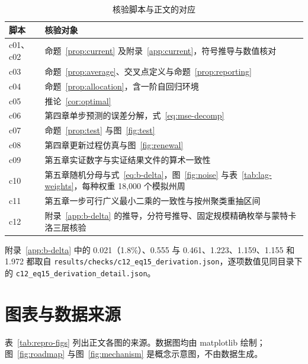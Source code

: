 \begin{table}[!htbp]
  \centering
  \caption{核验脚本与正文的对应}
  \label{tab:repro-checks}
  \small
  \begin{tabularx}{\textwidth}{@{}lX@{}}
    \toprule
    脚本 & 核验对象 \\
    \midrule
    c01、c02 & 命题~\ref{prop:current} 及附录~\ref{app:current}，符号推导与数值核对 \\
    c03 & 命题~\ref{prop:average}、交叉点定义与命题~\ref{prop:reporting} \\
    c04 & 命题~\ref{prop:allocation}，含一阶自回归环境 \\
    c05 & 推论~\ref{cor:optimal} \\
    c06 & 第四章单步预测的误差分解，式~\eqref{eq:mse-decomp} \\
    c07 & 命题~\ref{prop:test} 与图~\ref{fig:test} \\
    c08 & 第四章更新过程仿真与图~\ref{fig:renewal} \\
    c09 & 第五章实证数字与实证结果文件的算术一致性 \\
    c10 & 第五章随机分母与式~\eqref{eq:b-delta}，图~\ref{fig:noise} 与表~\ref{tab:lag-weights}，每种权重 18,000 个模拟州周 \\
    c11 & 第五章一步可行广义最小二乘的一致性与按州聚类重抽区间 \\
    c12 & 附录~\ref{app:b-delta} 的推导，分符号推导、固定规模精确枚举与蒙特卡洛三层核验 \\
    \bottomrule
  \end{tabularx}
\end{table}

附录~\ref{app:b-delta} 中的 0.021（1.8\%）、0.555 与 0.461、1.223、1.159、1.155 和 1.972 都取自 \nolinkurl{results/checks/c12_eq15_derivation.json}，逐项数值见同目录下的 \nolinkurl{c12_eq15_derivation_detail.json}。

\section{图表与数据来源}
\label{app:repro-figures}

表~\ref{tab:repro-figs} 列出正文各图的来源。数据图均由 matplotlib 绘制；图~\ref{fig:roadmap} 与图~\ref{fig:mechanism} 是概念示意图，不由数据生成。


